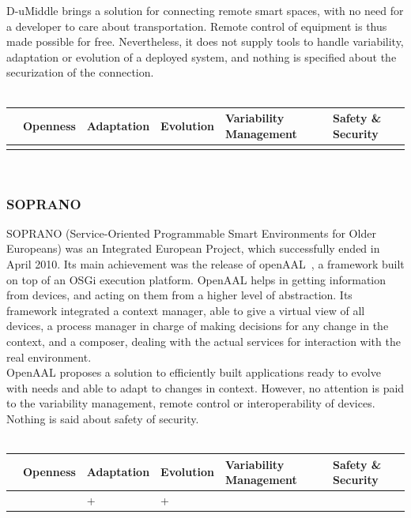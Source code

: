 D-uMiddle brings a solution for connecting remote smart spaces, with no need for a developer to care about transportation. Remote control of equipment is thus made possible for free. Nevertheless, it does not supply tools to handle variability, adaptation or evolution of a deployed system, and nothing is specified about the securization of the connection.\\
 \\
\begin{tabular}{ >{\centering}m{}| >{\centering}m{} >{\centering}m{}| >{\centering}m{} >{\centering}m{}| >{\centering\arraybackslash}m{}}
{\tiny Interoperability} & {\tiny Openness} & {\tiny Adaptation} & {\tiny Evolution} & {\tiny Variability Management} & {\tiny Safety \& Security}\\
 \hline
  &  &  &  &  & \\ 
  \hline
\end{tabular}\\

\subsubsection{SOPRANO}
SOPRANO (Service-Oriented Programmable Smart Environments for Older Europeans) was an Integrated European Project, which successfully ended in April 2010. Its main achievement was the release of openAAL~\cite{Wolf:2010}, a framework built on top of an OSGi execution platform. OpenAAL helps in getting information from devices, and acting on them from a higher level of abstraction. Its framework integrated a context manager, able to give a virtual view of all devices, a process manager in charge of making decisions for any change in the context, and a composer, dealing with the actual services for interaction with the real environment.\\

OpenAAL proposes a solution to efficiently built applications ready to evolve with needs and able to adapt to changes in context. However, no attention is paid to the variability management, remote control or interoperability of devices. Nothing is said about safety of security.\\
 \\
\begin{tabular}{ >{\centering}m{}| >{\centering}m{} >{\centering}m{}| >{\centering}m{} >{\centering}m{}| >{\centering\arraybackslash}m{}}
{\tiny Interoperability} & {\tiny Openness} & {\tiny Adaptation} & {\tiny Evolution} & {\tiny Variability Management} & {\tiny Safety \& Security}\\
 \hline
  &  & + & + &  & \\ 
  \hline
\end{tabular}\\



